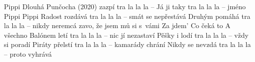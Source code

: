 \begin{TEXT}{Pippi Dlouhá Punčocha (2020)}
\SLOKA {} zazpí tra la la la --   \NL
Já ji taky  tra la la la --  jméno  \NL
\REFREN {} Pippi  Pippi \NL
{} \NL
{}  \NL
{} \NL
\SLOKA Radost rozdává tra la la la -- smát se nepřestává \NL
Druhým pomáhá  tra la la la -- nikdy neremcá \NL
\REFRENB  {} zavo, že  jsem  mů si s vámi  \NL
Za   jdem' \NL
Co čeká  to   \NL
A  všechno  \NL
\SLOKA Balónem letí tra la la la -- nic jí nezastaví \NL
Pěšky i lodí tra la la la -- vždy si poradí \NL
\SLOKA Piráty přelstí  tra la la la  -- kamarády chrání \NL
Nikdy se nevzdá  tra la la la -- proto vyhrává \NL
\REFRENHRAJ
\end{TEXT}